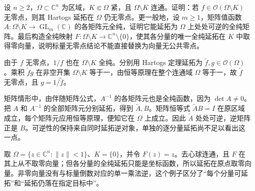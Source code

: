 \begin{exercise}[延拓与取值约束]\label{b3:ex:29-2}
设 \(n\ge2\)，\(\Omega\subset\mathbb C^n\) 为区域，\(K\Subset\Omega\) 紧，且 \(\Omega\setminus K\) 连通。证明：若 \(f\in\mathcal O(\Omega\setminus K)\) 无零点，则其 Hartogs 延拓在 \(\Omega\) 仍无零点。更一般地，设 \(m\ge1\)，矩阵值函数 \(A:\Omega\setminus K\to\operatorname{GL}_m(\mathbb C)\) 的各矩阵元全纯，证明它能延拓为 \(\Omega\) 上处处可逆的全纯矩阵。最后构造全纯映射 \(F:\Omega\setminus K\to\mathbb C^n\setminus\{0\}\)，使其各分量的唯一全纯延拓在 \(K\) 中取得零向量，说明标量无零点结论不能直接替换为向量无公共零点。
\end{exercise}
\begin{solution}
由于 \(f\) 无零点，\(1/f\) 也在 \(\Omega\setminus K\) 全纯。分别用 Hartogs 定理延拓为 \(\widetilde f,g\in\mathcal O(\Omega)\)。乘积 \(\widetilde f g\) 在非空开集 \(\Omega\setminus K\) 等于一，由恒等原理在整个连通域 \(\Omega\) 等于一，故 \(\widetilde f\) 无零点，且 \(g=1/\widetilde f\)。

矩阵情形中，由伴随矩阵公式，\(A^{-1}\) 的各矩阵元也是全纯函数，因为 \(\det A\ne0\)。把 \(A\) 和 \(A^{-1}\) 的全部矩阵元分别延拓，得到 \(\widetilde A,B\)。矩阵恒等式 \(\widetilde A B=I\) 在原区域成立，每个矩阵元应用恒等原理，便知它在 \(\Omega\) 上成立。因此 \(\widetilde A\) 处处可逆，逆矩阵正是 \(B\)。可逆性的保持来自同时延拓逆对象，单独的逐分量延拓尚不足以看出这一点。

取 \(\Omega=\{z\in\mathbb C^n:\lVert z\rVert<1\}\)、\(K=\{0\}\)，并令 \(F(z)=z\)。去心球连通，且 \(F\) 在其上从不取零向量；但各分量的全纯延拓只能是坐标函数，所以延拓在原点取零向量。非零向量没有与标量倒数对应的单一乘法逆，这个例子区分了“每个分量可延拓”和“延拓仍落在指定目标中”。
\end{solution}

